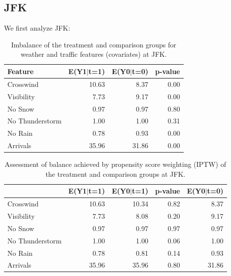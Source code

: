 \documentclass[11pt]{scrartcl}
\begin{document}
\subsection*{JFK}
We first analyze JFK:
\begin{table}[ht]
\centering
\begin{tabular}{lrrr}
  \hline
 Feature & E(Y1$|$t=1) & E(Y0$|$t=0) & p-value \\ 
  \hline
  Crosswind & 10.63 & 8.37 & 0.00 \\ 
  Visibility & 7.73 & 9.17 & 0.00 \\ 
  No Snow & 0.97 & 0.97 & 0.80 \\ 
  No Thunderstorm & 1.00 & 1.00 & 0.31 \\ 
  No Rain & 0.78 & 0.93 & 0.00 \\ 
  Arrivals & 35.96 & 31.86 & 0.00 \\ 
   \hline
\end{tabular}
\caption{Imbalance of the treatment and comparison groups for weather and traffic features (covariates) at JFK.} 
\label{tab:imbalance}
\end{table}


\begin{table}[ht!]
\centering
\begin{tabular}{lrrrr}
  \hline
 & E(Y1$|$t=1) & E(Y0$|$t=1) & p-value & E(Y0$|$t=0) \\ 
  \hline
  Crosswind & 10.63 & 10.34 & 0.82 & 8.37 \\ 
  Visibility & 7.73 & 8.08 & 0.20 & 9.17 \\ 
  No Snow & 0.97 & 0.97 & 0.97 & 0.97 \\ 
  No Thunderstorm & 1.00 & 1.00 & 0.06 & 1.00 \\ 
  No Rain & 0.78 & 0.81 & 0.14 & 0.93 \\ 
  Arrivals & 35.96 & 35.96 & 0.80 & 31.86 \\ 
   \hline
\end{tabular}
\caption{Assessment of balance achieved by propensity score weighting (IPTW) of the treatment and comparison groups at JFK.} 
\label{tab:balance}
\end{table}
\end{document}
